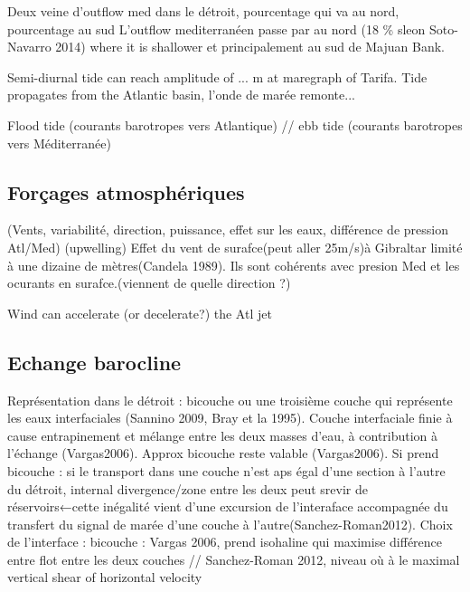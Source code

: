 Deux veine d'outflow med dans le détroit, pourcentage qui va au nord, pourcentage au sud
L’outflow mediterranéen passe par au nord (18 \% sleon Soto-Navarro 2014) where it is shallower et principalement au sud de Majuan Bank. 







Semi-diurnal tide can reach amplitude of ... m at maregraph of Tarifa. Tide propagates from the Atlantic basin, l'onde de marée remonte...


Flood tide (courants barotropes vers Atlantique) // ebb tide (courants barotropes vers Méditerranée)









\subsection{Forçages atmosphériques}

(Vents, variabilité, direction, puissance, effet sur les eaux, différence de pression Atl/Med) (upwelling)
Effet du vent de surafce(peut aller 25m/s)à Gibraltar limité à une dizaine de mètres(Candela 1989). Ils sont cohérents avec presion Med et les ocurants en surafce.(viennent de quelle direction ?)

Wind can accelerate (or decelerate?) the Atl jet



\subsection{Echange barocline}


Représentation dans le détroit : bicouche ou une troisième couche qui représente les eaux interfaciales (Sannino 2009, Bray et la 1995). Couche interfaciale finie à cause entrapinement et mélange entre les deux masses d'eau, à contribution à l’échange (Vargas2006). Approx bicouche reste valable (Vargas2006). Si prend bicouche : si le transport dans une couche n’est aps égal d’une section à l’autre du détroit, internal divergence/zone entre les deux peut srevir de réservoirs←cette inégalité vient d’une excursion de l’interaface accompagnée du transfert du signal de marée d’une couche à l’autre(Sanchez-Roman2012).
Choix de l’interface : bicouche : Vargas 2006, prend isohaline qui maximise différence entre flot entre les deux couches // Sanchez-Roman 2012, niveau où à le maximal vertical shear of horizontal velocity

